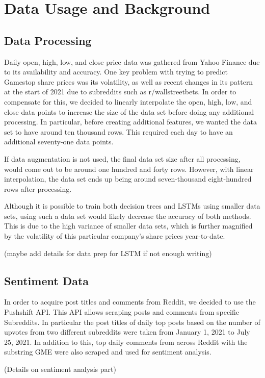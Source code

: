 \documentclass{article}
\begin{document}
\section{Data Usage and Background}
\subsection{Data Processing}

Daily open, high, low, and close price data was gathered from Yahoo Finance due to its availability and accuracy. One key problem with trying to predict Gamestop share prices was its volatility, as well as recent changes in its pattern at the start of 2021 due to subreddits such as r/wallstreetbets. In order to compensate for this, we decided to linearly interpolate the open, high, low, and close data points to increase the size of the data set before doing any additional processing. In particular, before creating additional features, we wanted the data set to have around ten thousand rows. This required each day to have an additional seventy-one data points.

If data augmentation is not used, the final data set size after all processing, would come out to be around one hundred and forty rows. However, with linear interpolation, the data set ends up being around seven-thousand eight-hundred rows after processing.

Although it is possible to train both decision trees and LSTMs using smaller data sets, using such a data set would likely decrease the accuracy of both methods. This is due to the high variance of smaller data sets, which is further magnified by the volatility of this particular company's share prices year-to-date.

(maybe add details for data prep for LSTM if not enough writing)

\subsection{Sentiment Data}
In order to acquire post titles and comments from Reddit, we decided to use the Pushshift API. This API allows scraping posts and comments from specific Subreddits. In particular the post titles of daily top posts based on the number of upvotes from two different subreddits were taken from January 1, 2021 to July 25, 2021. In addition to this, top daily comments from across Reddit with the substring GME were also scraped and used for sentiment analysis.

(Details on sentiment analysis part)
\end{document}
